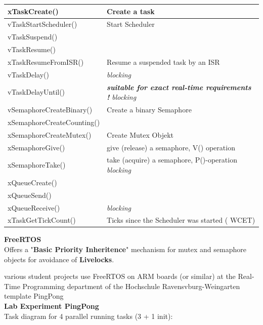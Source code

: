 \begin{tabular}{|p{1.6in}|p{3.0in}|} \hline 
xTaskCreate() & Create a task \\ \hline 
vTaskStartScheduler() & Start Scheduler \\ \hline 
vTaskSuspend() &  \\ \hline 
vTaskResume() &  \\ \hline 
xTaskResumeFromISR() & Resume a suspended task by an ISR \\ \hline 
vTaskDelay() &                    \textit{blocking} \\ \hline 
vTaskDelayUntil() & \textbf{\textit{ suitable for exact real-time requirements !  }}\textit{blocking}\textbf{\textit{}} \\ \hline 
\textbf{\textit{}}vSemaphoreCreateBinary() & Create a binary Semaphore \\ \hline 
xSemaphoreCreateCounting() &  \\ \hline 
xSemaphoreCreateMutex()  & Create Mutex Objekt \\ \hline 
xSemaphoreGive() & give (release) a semaphore, V() operation \\ \hline 
xSemaphoreTake() & take (acquire) a semaphore, P()-operation    \textit{blocking} \\ \hline 
xQueueCreate() &  \\ \hline 
xQueueSend() &  \\ \hline 
xQueueReceive() &                    \textit{blocking} \\ \hline 
xTaskGetTickCount() & Ticks since the Scheduler was started ( WCET) \\ \hline 
\end{tabular}

{\rot\bf FreeRTOS }\\

Offers a "\textbf{Basic Priority Inheritence}" mechanism for mutex and semaphore objects for avoidance of \textbf{Livelocks}.

various student projects use FreeRTOS on ARM boards (or similar) at the Real-Time Programming department of the Hochschule Ravensvburg-Weingarten  template PingPong\\


{\rot\bf Lab Experiment PingPong}\\

Task diagram for 4 parallel running tasks (3 + 1 init):\\

